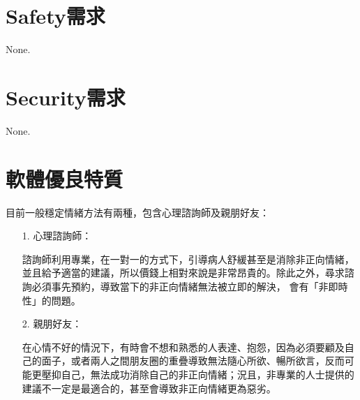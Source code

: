 \documentclass[12pt]{scrreprt}
\begin{document}
\section{Safety需求}None.

\section{Security需求}None.

\section{軟體優良特質}
目前一般穩定情緒方法有兩種，包含心理諮詢師及親朋好友：

\begin{itemize}
\item[1.]{心理諮詢師：}

諮詢師利用專業，在一對一的方式下，引導病人舒緩甚至是消除非正向情緒，並且給予適當的建議，所以價錢上相對來說是非常昂貴的。除此之外，尋求諮詢必須事先預約，導致當下的非正向情緒無法被立即的解決， 會有「非即時性」的問題。

\item[2.]{親朋好友：}

在心情不好的情況下，有時會不想和熟悉的人表達、抱怨，因為必須要顧及自己的面子，或者兩人之間朋友圈的重疊導致無法隨心所欲、暢所欲言，反而可能更壓抑自己，無法成功消除自己的非正向情緒；況且，非專業的人士提供的建議不一定是最適合的，甚至會導致非正向情緒更為惡劣。

\end{itemize}
\end{document}
